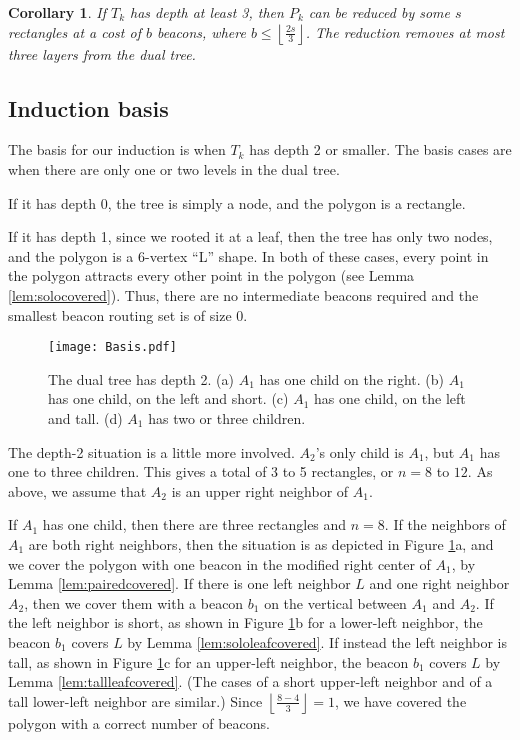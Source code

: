 \documentclass{article}
\newtheorem{cor}[thm]{Corollary}
\newcommand{\floor}[2]{\ensuremath{\left \lfloor {\frac{#1}{#2}} \right
\rfloor}}
\begin{document}
		\begin{cor}\label{cor:casescondensed}
			If $T_k$ has depth at least 3, then $P_k$ can be reduced by some $s$
			rectangles at a cost of $b$ beacons, where $b \leq \floor{2s}{3}$.
			The reduction removes at most three layers from the dual tree.
		\end{cor}
		
	\subsection{Induction basis}
		The basis for our induction is when $T_k$ has depth 2 or smaller.
				The basis cases are when there are only one or two levels in the dual tree.
				
		If it has depth 0,
		the tree is simply a node, and 
		the polygon is a rectangle.
		
		If it has depth 1,
		since we rooted it at a leaf, then the tree has only two nodes, and
		the polygon is a 6-vertex ``L'' shape.
		In both of these cases, every point in the polygon attracts every other point
		in the polygon (see Lemma \ref{lem:solocovered}).  Thus, there are no intermediate
		beacons required and the smallest beacon routing set is of size 0.
		\begin{figure}[htbp] 
			\begin{center}
				\texttt{[image: Basis.pdf]} 
			\end{center}
			\caption{ The dual tree has depth 2. 
					(a) $A_1$ has one child on the right.
					(b) $A_1$ has one child, on the left and short.
					(c) $A_1$ has one child, on the left and tall.
					(d) $A_1$ has two or three children.
					}
			\label{fig:basis}
		\end{figure}  
		The depth-2 situation is a little more involved.  $A_2$'s only child is $A_1$,
		but $A_1$ has one to three children.  This gives a total of 3 to 5
		rectangles, or $n = 8$ to $12$.  As above, we assume that $A_2$ is an upper
		right neighbor of $A_1$.
		
		If $A_1$ has one child, then there are three rectangles and $n = 8$.
		If the neighbors of $A_1$ are both right neighbors, then the situation is
		as depicted in Figure \ref{fig:basis}a, and we
		cover the polygon with one beacon in the modified right center of $A_1$, by
		Lemma \ref{lem:pairedcovered}. 
		If there is one left neighbor $L$ and one right neighbor $A_2$, then we cover
		them with a beacon $b_1$ on the vertical between $A_1$ and $A_2$.
		If the left neighbor is short, as shown in Figure \ref{fig:basis}b for a
		lower-left neighbor, the beacon $b_1$ covers $L$ by Lemma
		\ref{lem:sololeafcovered}.
		If instead the left neighbor is tall, as shown in Figure \ref{fig:basis}c for
		an upper-left neighbor, the beacon $b_1$ covers $L$ by Lemma
		\ref{lem:tallleafcovered}.
		(The cases of a short upper-left neighbor and of a tall lower-left neighbor
		are similar.)  Since $\floor{8-4}{3} = 1$, we have covered the
		polygon with a correct number of beacons.
		
\end{document}
